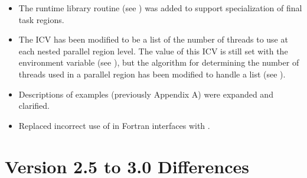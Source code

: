 \begin{itemize}
\item The  runtime library routine (see
) was
added to support specialization of final task regions.

\item The  ICV has been modified to be a list of the number of threads to use
at each nested parallel region level. The value of this ICV is still set with the
 environment variable (see
), but the
algorithm for determining the number of threads used in a parallel region has been
modified to handle a list (see
).

\item Descriptions of examples (previously Appendix A) were expanded and
clarified.

\item Replaced incorrect use of  in Fortran interfaces with
.
\end{itemize}







\section{Version 2.5 to 3.0 Differences}
\label{sec:Version 2.5 to 3.0 Differences}

